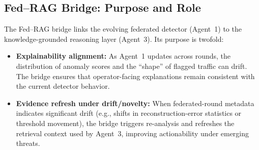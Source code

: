\subsection{Fed--RAG Bridge: Purpose and Role}
The Fed--RAG bridge links the evolving federated detector (Agent~1) to the knowledge-grounded reasoning layer (Agent~3). Its purpose is twofold:
\begin{itemize}
  \item \textbf{Explainability alignment:} As Agent~1 updates across rounds, the distribution of anomaly scores and the ``shape'' of flagged traffic can drift. The bridge ensures that operator-facing explanations remain consistent with the current detector behavior.
  \item \textbf{Evidence refresh under drift/novelty:} When federated-round metadata indicates significant drift (e.g., shifts in reconstruction-error statistics or threshold movement), the bridge triggers re-analysis and refreshes the retrieval context used by Agent~3, improving actionability under emerging threats.
\end{itemize}

